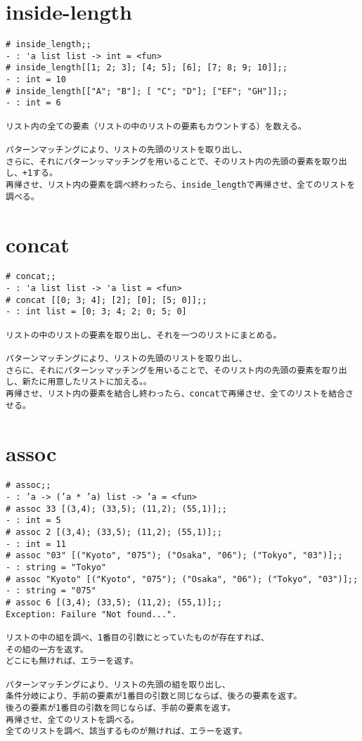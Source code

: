 \documentclass{jarticle}
\begin{document}
\newpage
\section{inside-length}
\begin{verbatim}
# inside_length;; 
- : 'a list list -> int = <fun> 
# inside_length[[1; 2; 3]; [4; 5]; [6]; [7; 8; 9; 10]];; 
- : int = 10 
# inside_length[["A"; "B"]; [ "C"; "D"]; ["EF"; "GH"]];; 
- : int = 6

リスト内の全ての要素（リストの中のリストの要素もカウントする）を数える。

パターンマッチングにより、リストの先頭のリストを取り出し、
さらに、それにパターンッマッチングを用いることで、そのリスト内の先頭の要素を取り出し、+1する。
再帰させ、リスト内の要素を調べ終わったら、inside_lengthで再帰させ、全てのリストを調べる。
\end{verbatim}

\newpage
\section{concat}
\begin{verbatim}
# concat;; 
- : 'a list list -> 'a list = <fun> 
# concat [[0; 3; 4]; [2]; [0]; [5; 0]];; 
- : int list = [0; 3; 4; 2; 0; 5; 0]

リストの中のリストの要素を取り出し、それを一つのリストにまとめる。

パターンマッチングにより、リストの先頭のリストを取り出し、
さらに、それにパターンッマッチングを用いることで、そのリスト内の先頭の要素を取り出し、新たに用意したリストに加える。。
再帰させ、リスト内の要素を結合し終わったら、concatで再帰させ、全てのリストを結合させる。
\end{verbatim}

\newpage
\section{assoc}
\begin{verbatim}
# assoc;; 
- : ’a -> (’a * ’a) list -> ’a = <fun> 
# assoc 33 [(3,4); (33,5); (11,2); (55,1)];; 
- : int = 5 
# assoc 2 [(3,4); (33,5); (11,2); (55,1)];; 
- : int = 11 
# assoc "03" [("Kyoto", "075"); ("Osaka", "06"); ("Tokyo", "03")];; 
- : string = "Tokyo" 
# assoc "Kyoto" [("Kyoto", "075"); ("Osaka", "06"); ("Tokyo", "03")];; 
- : string = "075" 
# assoc 6 [(3,4); (33,5); (11,2); (55,1)];; 
Exception: Failure "Not found...".

リストの中の組を調べ、1番目の引数にとっていたものが存在すれば、
その組の一方を返す。
どこにも無ければ、エラーを返す。

パターンマッチングにより、リストの先頭の組を取り出し、
条件分岐により、手前の要素が1番目の引数と同じならば、後ろの要素を返す。
後ろの要素が1番目の引数を同じならば、手前の要素を返す。
再帰させ、全てのリストを調べる。
全てのリストを調べ、該当するものが無ければ、エラーを返す。
\end{verbatim}
\end{document}
